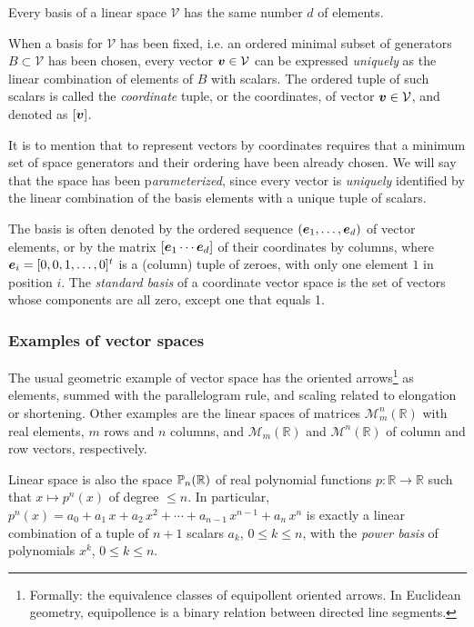 Every basis of a linear space $\mathcal{V}$ has the same number $d$ of elements. 

When a basis for $\mathcal{V}$ has been fixed, i.e. an ordered minimal subset of generators ${B} \subset \mathcal{V}$  has been chosen, every vector $\v{v}\in \mathcal{V}$ can be expressed \emph{uniquely} as the linear combination of elements of ${B}$ with scalars. The ordered tuple of such scalars is called the \emph{coordinate} tuple, or the coordinates, of vector $\v{v}\in\mathcal{V}$, and denoted as $[\v{v}]$.  

\begin{remark}
It is to mention that to represent vectors by coordinates requires that a minimum set of space generators and their ordering have been already chosen. We will say that the space has been p\emph{arameterized}, since every vector is \emph{uniquely} identified by the linear combination of the basis elements with a unique tuple of scalars. 
\end{remark}

\begin{remark}
The basis is often denoted by the ordered sequence $(\v{e}_1,\ldots,\v{e}_d)$ of vector elements, or by the matrix $[\v{e}_1 \cdots \v{e}_d]$ of their coordinates by columns, where $\v{e}_i = [0, 0, 1, \ldots, 0]^t$ is a (column) tuple of zeroes, with only one element $1$ in position $i$. The \emph{standard basis} of a coordinate vector space is the set of vectors whose components are all zero, except one that equals 1.
\end{remark}


\subsubsection*{Examples of vector spaces} 

The usual geometric example of vector space has the oriented arrows\footnote{Formally: the equivalence classes of equipollent oriented arrows. In Euclidean geometry, equipollence is a binary relation between directed line segments. } as elements, summed with the parallelogram rule, and scaling related to elongation or shortening.
Other examples are the linear spaces of matrices $\mathcal{M}^n_m(\mathbb{R})$ with real elements, $m$ rows and $n$ columns, and $\mathcal{M}_m(\mathbb{R})$ and $\mathcal{M}^n(\mathbb{R})$ of column and row vectors, respectively.

Linear space is also the space $\P_n(\mathbb{R})$ of real polynomial functions $p: \mathbb{R}\to\mathbb{R}$ such that $x\mapsto p^n(x)$ of degree $\leq n$. In particular, $p^n(x) = a_0 + a_1\, x + a_2\, x^2+ \cdots + a_{n-1}\, x^{n-1} + a_{n}\, x^n$ is exactly a linear combination of a tuple of $n+1$ scalars $a_k$, $0\leq k\leq n$, with the \emph{power basis} of polynomials $x^k$, $0\leq k\leq n$. 


